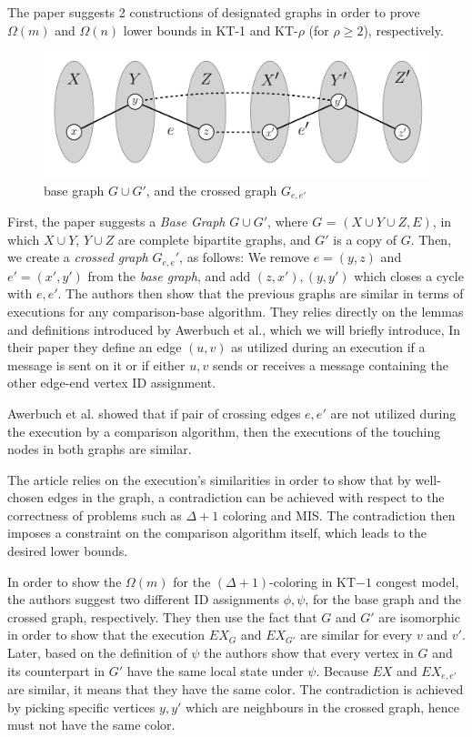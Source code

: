 \documentclass[11pt]{article}
\begin{document}
The paper suggests 2 constructions of designated graphs in order to prove $\Omega(m)$ and $\Omega(n)$ lower bounds in KT-1 and KT-$\rho$ (for $\rho \ge 2$), respectively. 
\begin{figure}[h]
    \centering
    \includegraphics[scale=0.7]{graph_cross_graph}
    \caption{base graph $G \cup G'$, and the crossed graph $G_{e,e'}$}
    \label{fig:graph_cross_graph}
\end{figure}
First, the paper suggests a \textit{Base Graph} $G \cup G'$, where $G$ = $( X \cup Y \cup Z, E)$, in which $X \cup Y$, $Y \cup Z$ are complete bipartite graphs, and $G'$ is a copy of $G$. 
Then, we create a \textit{crossed graph} $G_{e,e}'$, as follows: 
We remove $e=(y,z)$ and $e'=(x',y')$ from the \textit{base graph}, and add $(z,x'), (y,y')$ which closes a cycle with $e,e'$. The authors then show that the previous graphs are similar in terms of executions for any comparison-base algorithm. They relies directly on the lemmas and definitions introduced by Awerbuch et al.\cite{Awerbuch}, which we will briefly introduce, In their paper they define an edge $(u,v)$ as utilized during an execution if a message is sent on it or if either $u, v$ sends or receives a message containing the other edge-end vertex ID assignment.

Awerbuch et al. showed that if pair of crossing edges $e, e'$ are not utilized during the execution by a comparison algorithm, then the executions of the touching nodes in both graphs are similar.

The article relies on the execution's similarities in order to show that by well-chosen edges in the graph, a contradiction can be achieved with respect to the correctness of problems such as $\Delta +1$ coloring and MIS. The contradiction then imposes a constraint on the comparison algorithm itself, which leads to the desired lower bounds.

In order to show the $\Omega(m)$ for the $(\Delta +1)$-coloring in KT$-1$ congest model, the authors suggest two different ID assignments $\phi, \psi$, for the base graph and the crossed graph, respectively. They then use the fact that $G$ and $G'$ are isomorphic in order to show that the execution $EX_G$ and $EX_{G'}$ are similar for every $v$ and $v'$. Later, based on the definition of $\psi$ the authors show that every vertex in $G$ and its counterpart in $G'$ have the same local state under $\psi$. Because $EX$ and $EX_{e,e'}$ are similar, it means that they have the same color. The contradiction is achieved by picking specific vertices $y,y'$ which are neighbours in the crossed graph, hence must not have the same color.
\end{document}
